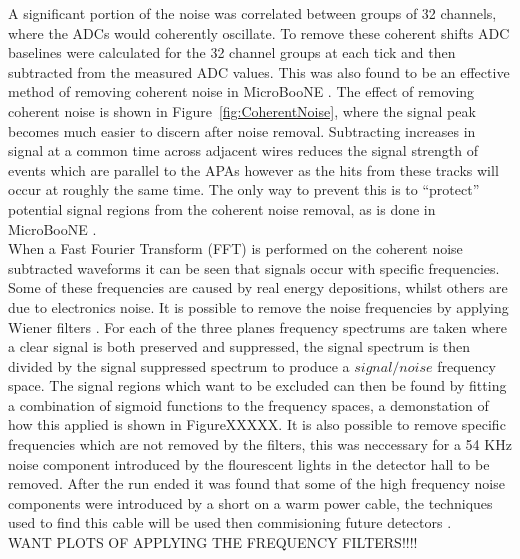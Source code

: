 A significant portion of the noise was correlated between groups of 32 channels, where the ADCs would coherently oscillate. To remove these coherent shifts ADC baselines were calculated for the 32 channel groups at each tick and then subtracted from the measured ADC values. This was also found to be an effective method of removing coherent noise in MicroBooNE \citep{uBooNENoise}. The effect of removing coherent noise is shown in Figure~\ref{fig:CoherentNoise}, where the signal peak becomes much easier to discern after noise removal. Subtracting increases in signal at a common time across adjacent wires reduces the signal strength of events which are parallel to the APAs however as the hits from these tracks will occur at roughly the same time. The only way to prevent this is to ``protect'' potential signal regions from the coherent noise removal, as is done in MicroBooNE \citep{uBooNENoise}. \\

When a Fast Fourier Transform (FFT) \citep{CoTuFFT} is performed on the coherent noise subtracted waveforms it can be seen that signals occur with specific frequencies. Some of these frequencies are caused by real energy depositions, whilst others are due to electronics noise. It is possible to remove the noise frequencies by applying Wiener filters \citep{WienerFilter}. For each of the three planes frequency spectrums are taken where a clear signal is both preserved and suppressed, the signal spectrum is then divided by the signal suppressed spectrum to produce a $signal/noise$ frequency space. The signal regions which want to be excluded can then be found by fitting a combination of sigmoid functions to the frequency spaces, a demonstation of how this applied is shown in FigureXXXXX. It is also possible to remove specific frequencies which are not removed by the filters, this was neccessary for a 54 KHz noise component introduced by the flourescent lights in the detector hall to be removed. After the run ended it was found that some of the high frequency noise components were introduced by a short on a warm power cable, the techniques used to find this cable will be used then commisioning future detectors \citep{35tonNoiseMeeting}. \\

WANT PLOTS OF APPLYING THE FREQUENCY FILTERS!!!! \\

